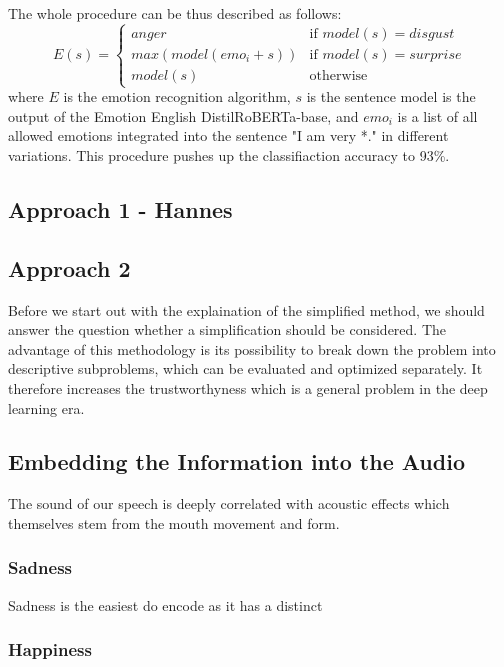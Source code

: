 \documentclass[11pt]{article}
\begin{document}
The whole procedure can be thus described as follows:
{
\small
\begin{equation*}
E(s)=\begin{cases}
  anger & \text{if } model(s)=disgust\\      
  max(model(emo_i+s)) & \text{if }  model(s)=surprise\\
  model(s) & \text{otherwise } 
\end{cases}
\end{equation*}
}
where $E$ is the emotion recognition algorithm, $s$ is the sentence model is the output of the Emotion English DistilRoBERTa-base, and $emo_i$ is a list of all allowed emotions integrated into the sentence "I am very *." in different variations.
This procedure pushes up the classifiaction accuracy to 93\%.

\subsection{Approach 1 - Hannes}
\subsection{Approach 2}

Before we start out with the explaination of the simplified method, we should answer the question whether a simplification should be considered. The advantage of this methodology is its possibility to break down the problem into descriptive subproblems, which can be evaluated and optimized separately. It therefore increases the trustworthyness which is a general problem in the deep learning era.


\subsection{Embedding the Information into the Audio}

The sound of our speech is deeply correlated with acoustic effects which themselves stem from the mouth movement and form\cite{arias_beyond_2020}. 

\subsubsection{Sadness}

Sadness is the easiest do encode as it has a distinct

\subsubsection{Happiness}
\end{document}
